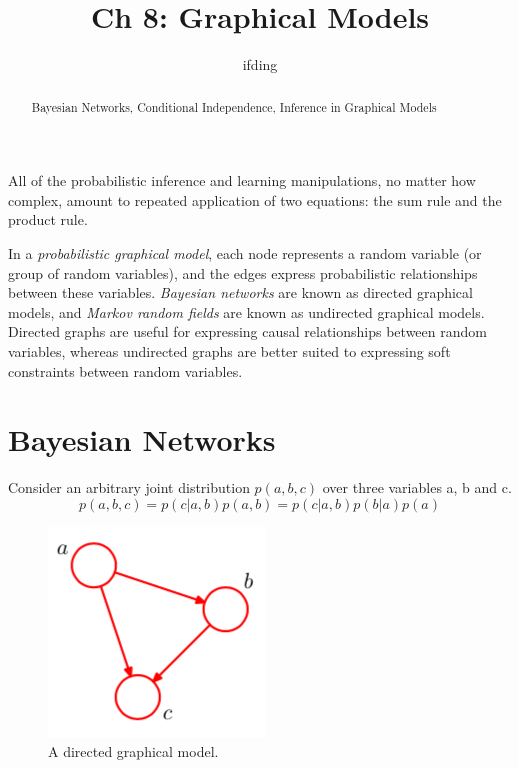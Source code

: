 \documentclass[5p,sort&compress]{elsarticle}
\begin{document}
\begin{frontmatter}
    \title{Ch 8: Graphical Models}
    \author{ifding}
    
    \begin{abstract}
        Bayesian Networks, Conditional Independence, Inference in Graphical Models
    \end{abstract}


\end{frontmatter}


All of the probabilistic inference and learning manipulations, no matter how complex, amount to repeated application of two equations: the sum rule and the product rule. 

In a \textit{probabilistic graphical model}, each node represents a random variable (or group of random variables), and the edges express probabilistic relationships between these variables. \textit{Bayesian networks} are known as directed graphical models, and \textit{Markov random fields} are known as undirected graphical models. Directed graphs are useful for expressing causal relationships between random variables, whereas undirected graphs are better suited to expressing soft constraints between random variables.


\section{Bayesian Networks}

Consider an arbitrary joint distribution $p(a, b, c)$ over three variables a, b and c.
\begin{equation}
p(a, b, c) = p(c | a, b) p(a,b) = p(c | a, b) p(b | a) p(a)
\end{equation}

\begin{figure}[ht]
     \centering
     \includegraphics[width = 0.5\linewidth]{figure/figure8_1.png}
     \caption{A directed graphical model.}
     \label{fig:8_1}
\end{figure}
\end{document}
